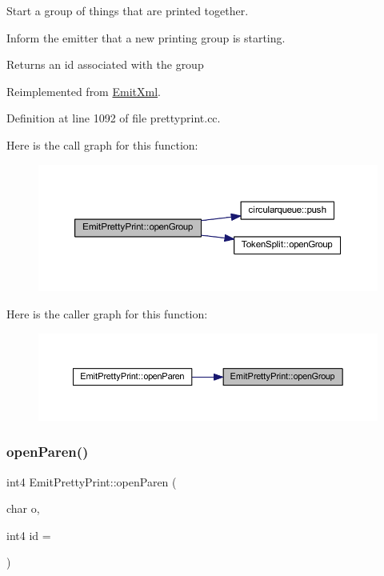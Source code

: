 Start a group of things that are printed together. 

Inform the emitter that a new printing group is starting. \begin{DoxyReturn}{Returns}
an id associated with the group 
\end{DoxyReturn}


Reimplemented from \mbox{\hyperlink{class_emit_xml_a7f370f4d245182bc6132885a0e8b4d71}{Emit\+Xml}}.



Definition at line 1092 of file prettyprint.\+cc.

Here is the call graph for this function\+:
\nopagebreak
\begin{figure}[H]
\begin{center}
\leavevmode
\includegraphics[width=350pt]{class_emit_pretty_print_aebc625908acafdfead7424ea48d53ce1_cgraph}
\end{center}
\end{figure}
Here is the caller graph for this function\+:
\nopagebreak
\begin{figure}[H]
\begin{center}
\leavevmode
\includegraphics[width=350pt]{class_emit_pretty_print_aebc625908acafdfead7424ea48d53ce1_icgraph}
\end{center}
\end{figure}
\mbox{\label{class_emit_pretty_print_a45992e62b83097eccbd431e1957f2108}} 
\subsubsection{\texorpdfstring{openParen()}{openParen()}}
{\footnotesize\ttfamily int4 Emit\+Pretty\+Print\+::open\+Paren (\begin{DoxyParamCaption}\item[{char}]{o,  }\item[{int4}]{id = {} }\end{DoxyParamCaption})\hspace{0.3cm}{\ttfamily [virtual]}}



